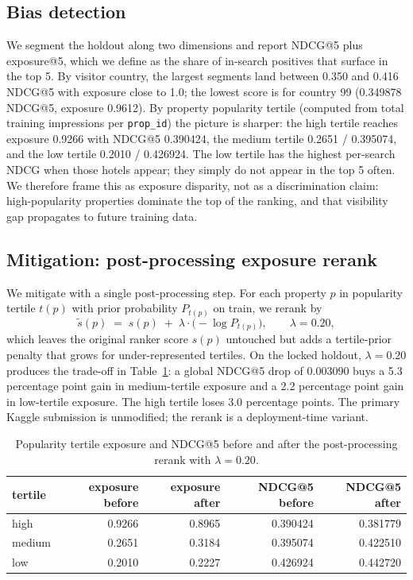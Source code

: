 \documentclass[runningheads]{llncs}
\begin{document}
\subsection{Bias detection}
\label{sec:bias-detect}

We segment the holdout along two dimensions and report NDCG@5 plus
exposure@5, which we define as the share of in-search positives
that surface in the top 5. By visitor country, the largest segments
land between 0.350 and 0.416 NDCG@5 with exposure close to 1.0;
the lowest score is for country 99 (0.349878 NDCG@5, exposure
0.9612). By property popularity tertile (computed from total
training impressions per \texttt{prop\_id}) the picture is
sharper: the high tertile reaches exposure 0.9266 with NDCG@5
0.390424, the medium tertile 0.2651 / 0.395074, and the low
tertile 0.2010 / 0.426924. The low tertile has the highest
per-search NDCG when those hotels appear; they simply do not
appear in the top 5 often. We therefore frame this as exposure
disparity, not as a discrimination claim: high-popularity
properties dominate the top of the ranking, and that visibility
gap propagates to future training data.

\subsection{Mitigation: post-processing exposure rerank}
\label{sec:bias-mitigate}

We mitigate with a single post-processing step. For each property
$p$ in popularity tertile $t(p)$ with prior probability
$P_{t(p)}$ on train, we rerank by
\begin{equation}
\tilde{s}(p) \;=\; s(p) \;+\; \lambda \cdot \bigl(-\log P_{t(p)}\bigr),
\qquad \lambda = 0.20 ,
\end{equation}
which leaves the original ranker score $s(p)$ untouched but adds
a tertile-prior penalty that grows for under-represented tertiles.
On the locked holdout, $\lambda = 0.20$ produces the trade-off in
Table~\ref{tab:bias-tradeoff}: a global NDCG@5 drop of 0.003090 buys a
5.3 percentage point gain in medium-tertile exposure and a 2.2
percentage point gain in low-tertile exposure. The high tertile
loses 3.0 percentage points. The primary Kaggle submission is
unmodified; the rerank is a deployment-time variant.

\begin{table}[t]
\centering
\caption{Popularity tertile exposure and NDCG@5 before and after
the post-processing rerank with $\lambda = 0.20$.}
\label{tab:bias-tradeoff}
\begin{tabular}{lrrrr}
\toprule
tertile & exposure before & exposure after & NDCG@5 before & NDCG@5 after \\
\midrule
high   & 0.9266 & 0.8965 & 0.390424 & 0.381779 \\
medium & 0.2651 & 0.3184 & 0.395074 & 0.422510 \\
low    & 0.2010 & 0.2227 & 0.426924 & 0.442720 \\
\bottomrule
\end{tabular}
\end{table}
\end{document}
